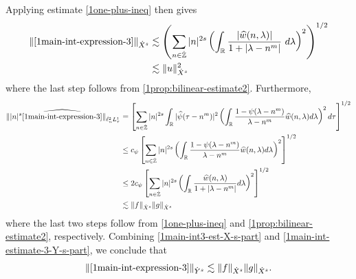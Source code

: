 %
%
Applying estimate \eqref{1one-plus-ineq} then gives
%
\begin{equation}
	\label{1main-int3-est-X-s-part}
	\begin{split}
		\| \eqref{1main-int-expression-3} \|_{\dot{X}^s}
		& \lesssim \left( \sum_{n \in \dot{\mathbb{Z}}} |n|^{2s}  \left ( \int_{\mathbb{R}}
		\frac{|\widehat{w}(n, \lambda)| }{1 + |\lambda - n^m|}
		 \ d\lambda \right )^2 \right)^{1/2}
		 \\
		& \lesssim \|u\|_{\dot{X}^s}^2
	\end{split}
\end{equation}
%
where the last step follows from \cref{1prop:bilinear-estimate2}.
Furthermore, 
%
%
\begin{equation}
	\label{1main-int-estimate-3-Y-s-part}
	\begin{split}
		\| | n |^s \widehat{\eqref{1main-int-expression-3}}\|_{\dot{\ell}^2_n L^1_\tau}
		& = \left[ \sum_{n \in \dot{\mathbb{Z}}} |n|^{2s} \int_{\mathbb{R}} |
		\widehat{\psi}(\tau - n^m) |^{2} \left( \int_{\mathbb{R}}\frac{1 - \psi(\lambda -
		n^m)}{\lambda - n^m} \widehat{w}(n, \lambda) d \lambda \right)^{2} d \tau
		\right]^{1/2}
		\\
		& \le c_{\psi} \left[ \sum_{n \in \dot{\mathbb{Z}}} |n|^{2s} \left(
		\int_{\mathbb{R}} \frac{1 - \psi(\lambda - n^m)}{\lambda - n^m}
		\widehat{w}(n, \lambda) d \lambda
		\right)^{2}\right]^{1/2}
		\\
		& \le 2 c_{\psi} \left[ \sum_{n \in \dot{\mathbb{Z}}} |n|^{2s} \left(
		\int_{\mathbb{R}} \frac{\widehat{w}(n, \lambda) }{1 + |\lambda - n^m|}
		d \lambda
		\right)^{2}\right]^{1/2}
		\\
		& \lesssim \|f\|_{\dot{X}^s} \|g\|_{\dot{X}^s} 
	\end{split}
\end{equation}
%
%
where the last two steps follow from \eqref{1one-plus-ineq} and
\cref{1prop:bilinear-estimate2}, respectively. Combining
\eqref{1main-int3-est-X-s-part} and \eqref{1main-int-estimate-3-Y-s-part}, we
conclude that
%
%
\begin{equation}
	\label{1main-int3-est}
	\begin{split}
		\|\eqref{1main-int-expression-3}\|_{\dot{Y}^s} 
		\lesssim \|f\|_{\dot{X}^s} \|g\|_{\dot{X}^s}.
	\end{split}
\end{equation}
%
%
%
